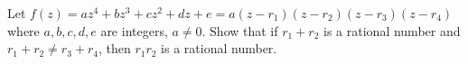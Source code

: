 Let $f(z) = a z^4 + b z^3 + c z^2 + d z + e = a(z-r_1)(z-r_2)(z-r_3)(z-r_4)$
where  $a,b,c,d,e$  are integers, $a \ne 0$.  Show that if  $r_1 + r_2$  is a
rational number and $r_1 + r_2 \ne r_3 + r_4$,  then  $r_1 r_2$  is a
rational number.
